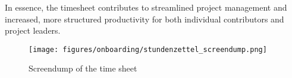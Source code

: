 In essence, the timesheet contributes to streamlined project management and increased, more structured productivity for both individual contributors and project leaders.

\begin{figure}[h]
    \centering
    \texttt{[image: figures/onboarding/stundenzettel\_screendump.png]}
    \caption{Screendump of the time sheet}
    \label{fig:time_sheet}
\end{figure}
